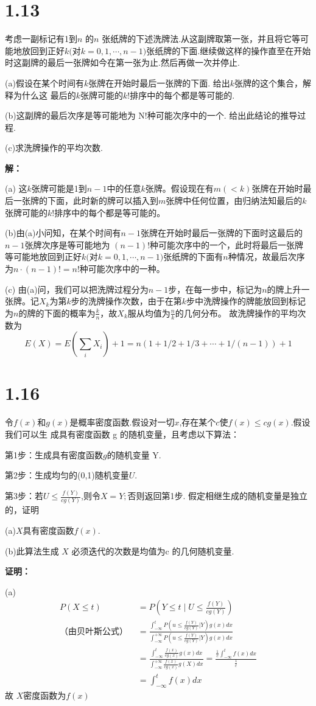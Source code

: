 \documentclass[12pt]{article}
\begin{document}
\section*{1.13}
考虑一副标记有1到$n$ 的$n$ 张纸牌的下述洗牌法.从这副牌取第一张，并且将它等可能地放回到正好$k($对$k=0,1,\cdots,n-1)$张纸牌的下面.继续做这样的操作直至在开始时这副牌的最后一张牌如今在第一张为止.然后再做一次并停止.

(a)假设在某个时间有$k$张牌在开始时最后一张牌的下面. 给出$k$张牌的这个集合，解释为什么这
最后的$k$张牌可能的$k!$排序中的每个都是等可能的.

(b)这副牌的最后次序是等可能地为 N!种可能次序中的一个. 给出此结论的推导过程.

(c)求洗牌操作的平均次数.

\textbf{解：}

(a) 这$k$张牌可能是1到$n-1$中的任意$k$张牌。假设现在有$m(<k)$张牌在开始时最后一张牌的下面，此时新的牌可以插入到$m$张牌中任何位置，由归纳法知最后的$k$张牌可能的$k!$排序中的每个都是等可能的。

(b)由(a)小问知，在某个时间有$n-1$张牌在开始时最后一张牌的下面时这最后的$n-1$张牌次序是等可能地为 $(n-1)!$种可能次序中的一个，此时将最后一张牌等可能地放回到正好$k($对$k=0,1,\cdots,n-1)$张纸牌的下面有$n$种情况，故最后次序为$n\cdot(n-1)!=n!$种可能次序中的一种。

(c) 由(a)问，我们可以把洗牌过程分为$n-1$步，在每一步中，标记为$n$的牌上升一张牌。记$X_k$为第$k$步的洗牌操作次数，由于在第$k$步中洗牌操作的牌能放回到标记为$n$的牌的下面的概率为$\frac{k}{n}$，故$X_k$服从均值为$\frac{n}{k}$的几何分布。
故洗牌操作的平均次数为
$$
E(X)=E(\sum_iX_i)+1=n(1+1/2+1/3+\cdots+1/(n-1))+1
$$
\section*{1.16}
令$f(x)$和$g(x)$是概率密度函数.假设对一切$x$,存在某个$c$使$f(x)\leqslant cg(x).$假设我们可以生
成具有密度函数 g 的随机变量，且考虑以下算法：

第1步：生成具有密度函数$g$的随机变量 Y.

第2步：生成均匀的(0,1)随机变量$U.$

第3步：若$U\leqslant\frac {f(Y)}{cg(Y)}$,则令$X=Y;$否则返回第1步.
假定相继生成的随机变量是独立的，证明

(a)$X$具有密度函数$f(x).$

(b)此算法生成 $X$ 必须迭代的次数是均值为c 的几何随机变量.

\textbf{证明：}

(a)
$$\begin{aligned}
P(X\leq t) & =P(Y\leq t\mid U\leq\frac{f(Y)}{cg(Y)}) \\
\text{（由贝叶斯公式） } & =\frac{\int_{-\infty}^{t}P(u\leq\frac{f(Y)}{cg(Y)}|Y)g(x)dx }{\int_{-\infty}^{+\infty}P(u\leq\frac{f(Y)}{cg(Y)}|Y)g(x)dx}\\
 & =\frac{\int_{-\infty}^{t}\frac{f(x)}{cg(x)}g(x)dx}{\int_{-\infty}^{+\infty}\frac{f(x)}{cg(x)}g(X)dx}=\frac{\frac{1}{c}\int_{-\infty}^{t}f(x)dx}{\frac{1}{c}} \\
 & =\int_{-\infty}^{t}f(x)dx
\end{aligned}$$
故 $X$密度函数为$f(x)$
\end{document}
